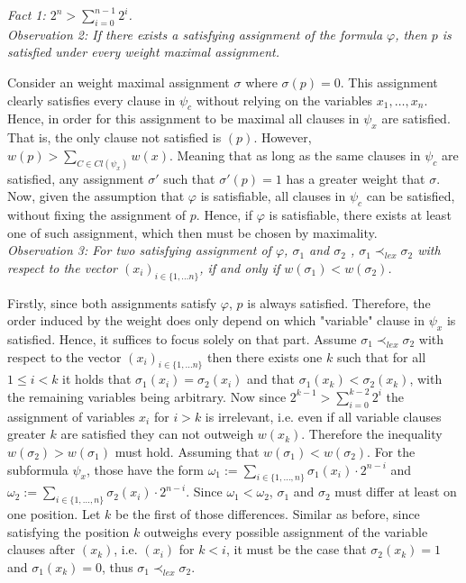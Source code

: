 \documentclass[11pt,a4paper]{article}
\begin{document}
\begin{enumerate}
\begin{enumerate}
\emph{Fact 1: $2^n > \sum_{i=0}^{n-1} 2^i$.} \\

\emph{Observation 2: If there exists a satisfying assignment of the formula $\varphi$,  then $p$ is satisfied under every weight maximal assignment.}

Consider an weight maximal assignment $\sigma$ where $\sigma(p)=0$. This assignment clearly satisfies every clause in $\psi_c$ without relying on the variables $x_1, \dots , x_n$. Hence, in order for this assignment to be maximal all clauses in $\psi_x$ are satisfied. That is, the only clause not satisfied is $(p)$. However, $w(p) > \sum_{C \in \mathit{Cl}(\psi_x)} w(x)$. Meaning that as long as the same clauses in $\psi_c$ are satisfied, any assignment $\sigma'$ such that $\sigma'(p)=1$ has a greater weight that $\sigma$. Now, given the assumption that $\varphi$ is satisfiable, all clauses in $\psi_c$ can be satisfied, without fixing the assignment of $p$. Hence, if $\varphi$ is satisfiable, there exists at least one of such assignment, which then must be chosen by maximality. \\

\emph{
Observation 3: For two satisfying assignment of $\varphi$, $\sigma_1$ and $\sigma_2$ , $\sigma_1 \prec_{lex} \sigma_2$ with respect to the vector $(x_i)_{i \in \{1, \dots n\}}$, if and only if $w(\sigma_1) < w(\sigma_2) $.  }


Firstly, since both assignments satisfy $\varphi$, $p$  is always satisfied. Therefore, the order induced by the weight does only depend on which "variable" clause in $\psi_x$ is satisfied. Hence, it suffices to focus solely on that part.
Assume  $\sigma_1 \prec_{lex} \sigma_2$ with respect to the vector $(x_i)_{i \in \{1, \dots n\}}$ then there exists one $k$ such that for all $1 \leq i < k$ it holds that $\sigma_1(x_i)=\sigma_2(x_i)$ and that $\sigma_1(x_k)<\sigma_2(x_k)$, with the remaining variables being arbitrary. Now since $2^{k-1} > \sum_{i=0}^{k-2} 2^i$ the assignment of variables $x_i$ for $i>k$ is irrelevant, i.e. even if all variable clauses greater $k$ are satisfied they can not outweigh $w(x_k)$. Therefore the inequality $w(\sigma_2)>w(\sigma_1)$ must hold. 
Assuming that  $w(\sigma_1) < w(\sigma_2)$. For the subformula $\psi_x$, those have the form $\omega_1 := \sum_{i \in \{1, \dots, n\}} \sigma_1(x_i) \cdot 2^{n-i}$ and $\omega_2 := \sum_{i \in \{1, \dots, n\}} \sigma_2(x_i) \cdot 2^{n-i}$. Since $\omega_1 < \omega_2$, $\sigma_1$ and $\sigma_2$ must differ at least on one position. Let $k$ be the first of those differences. Similar as before, since satisfying the position $k$ outweighs every possible assignment of the variable clauses after $(x_k)$, i.e. $(x_i)$ for $k<i$, it must be the case that $\sigma_2(x_k)=1$ and   $\sigma_1(x_k)=0$, thus $\sigma_1 \prec_{lex} \sigma_2$.  \\



\end{enumerate}
\end{enumerate}
\end{document}
